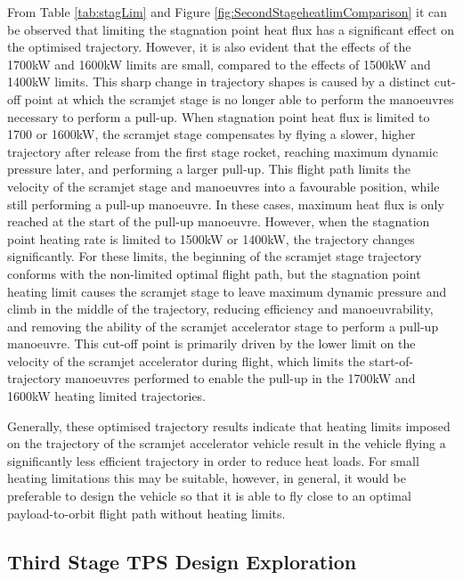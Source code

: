 From Table \ref{tab:stagLim} and Figure \ref{fig:SecondStageheatlimComparison} it can be observed that limiting the stagnation point heat flux has a significant effect on the optimised trajectory. However, it is also evident that the effects of the 1700kW and 1600kW limits are small, compared to the effects of 1500kW and 1400kW limits. 
This sharp change in trajectory shapes is caused by a distinct cut-off point at which the scramjet stage is no longer able to perform the manoeuvres necessary to perform a pull-up. When stagnation point heat flux is limited to 1700 or 1600kW, the scramjet stage compensates by flying a slower, higher trajectory after release from the first stage rocket, reaching maximum dynamic pressure later, and performing a larger pull-up. This flight path limits the velocity of the scramjet stage and manoeuvres into a favourable position, while still performing a pull-up manoeuvre. In these cases, maximum heat flux is only reached at the start of the pull-up manoeuvre. However, when the stagnation point heating rate is limited to 1500kW or 1400kW, the trajectory changes significantly. For these limits, the beginning of the scramjet stage trajectory conforms with the non-limited optimal flight path, but the stagnation point heating limit causes the scramjet stage to leave maximum dynamic pressure and climb in the middle of the trajectory, reducing efficiency and manoeuvrability, and removing the ability of the scramjet accelerator stage to perform a pull-up manoeuvre. This cut-off point is primarily driven by the lower limit on the velocity of the scramjet accelerator during flight, which limits the start-of-trajectory manoeuvres performed to enable the pull-up in the 1700kW and 1600kW heating limited trajectories. 

Generally, these optimised trajectory results indicate that heating limits imposed on the trajectory of the scramjet accelerator vehicle result in the vehicle flying a significantly less efficient trajectory in order to reduce heat loads. For small heating limitations this may be suitable, however, in general, it would be preferable to design the vehicle so that it is able to fly close to an optimal payload-to-orbit flight path without heating limits. 



\subsection{Third Stage TPS Design Exploration}\label{sec:thirdstageheat}

